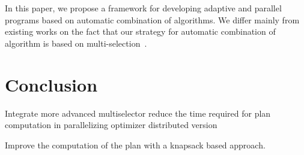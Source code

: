 In this paper, we propose a framework for developing adaptive and parallel programs based on 
automatic combination of algorithms. We differ mainly from existing works on the fact that our strategy for 
automatic combination of algorithm is based on multi-selection~\cite{Huberman}.

\section{Conclusion} \label{conclusion}

Integrate more advanced multiselector
reduce the time required for plan computation in parallelizing optimizer
distributed version

Improve the computation of the plan with a knapsack based approach.









